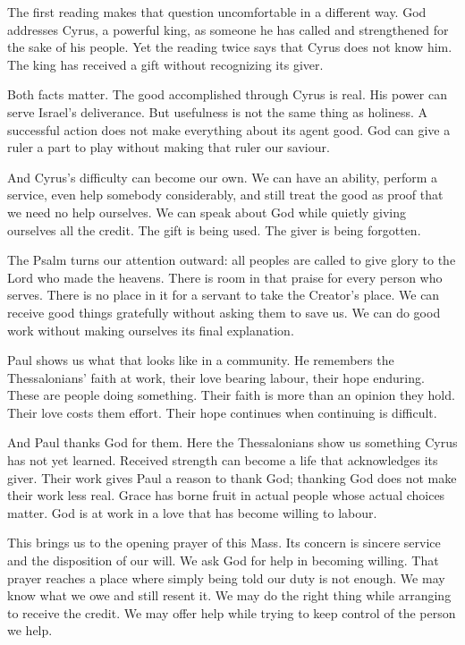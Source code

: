 The first reading makes that question uncomfortable in a different way. God addresses Cyrus, a powerful king, as someone he has called and strengthened for the sake of his people. Yet the reading twice says that Cyrus does not know him. The king has received a gift without recognizing its giver.

Both facts matter. The good accomplished through Cyrus is real. His power can serve Israel's deliverance. But usefulness is not the same thing as holiness. A successful action does not make everything about its agent good. God can give a ruler a part to play without making that ruler our saviour.

And Cyrus's difficulty can become our own. We can have an ability, perform a service, even help somebody considerably, and still treat the good as proof that we need no help ourselves. We can speak about God while quietly giving ourselves all the credit. The gift is being used. The giver is being forgotten.

The Psalm turns our attention outward: all peoples are called to give glory to the Lord who made the heavens. There is room in that praise for every person who serves. There is no place in it for a servant to take the Creator's place. We can receive good things gratefully without asking them to save us. We can do good work without making ourselves its final explanation.

Paul shows us what that looks like in a community. He remembers the Thessalonians' faith at work, their love bearing labour, their hope enduring. These are people doing something. Their faith is more than an opinion they hold. Their love costs them effort. Their hope continues when continuing is difficult.

And Paul thanks God for them. Here the Thessalonians show us something Cyrus has not yet learned. Received strength can become a life that acknowledges its giver. Their work gives Paul a reason to thank God; thanking God does not make their work less real. Grace has borne fruit in actual people whose actual choices matter. God is at work in a love that has become willing to labour.

This brings us to the opening prayer of this Mass. Its concern is sincere service and the disposition of our will. We ask God for help in becoming willing. That prayer reaches a place where simply being told our duty is not enough. We may know what we owe and still resent it. We may do the right thing while arranging to receive the credit. We may offer help while trying to keep control of the person we help.

